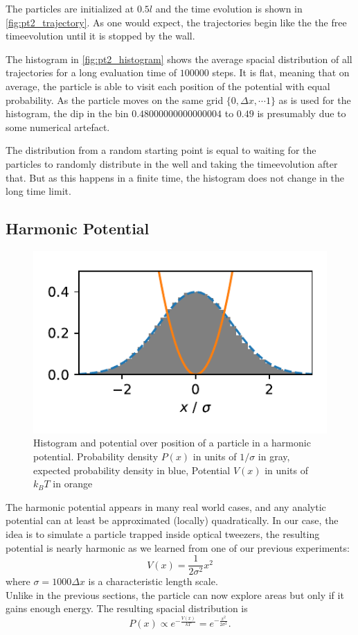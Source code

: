 \documentclass[
    parskip=half, 
    twoside=false,
    twocolumn=true,
    fontsize=11pt,
]{scrarticle}
\begin{document}
The particles are initialized at $0.5 l$ and the time evolution is shown in \autoref{fig:pt2_trajectory}.
As one would expect, the trajectories begin like the the free timeevolution until it is stopped by the wall.

The histogram in \autoref{fig:pt2_histogram} shows the average spacial distribution of all trajectories for a long evaluation time of $100000$ steps. 
It is flat, meaning that on average, the particle is able to visit each position of the potential with equal probability.
As the particle moves on the same grid $\{0, \Delta x, \cdots 1\}$ as is used for the histogram, the dip in the bin $0.48000000000000004$ to $0.49$ is presumably due to some numerical artefact.

The distribution from a random starting point is equal to waiting for the particles to randomly distribute in the well and taking the timeevolution after that.
But as this happens in a finite time, the histogram does not change in the long time limit.


\subsection{Harmonic Potential}
\begin{figure}
    \centering
    \includegraphics{figures/03 histogram.pdf}
    \caption{
        Histogram and potential over position of a particle in a harmonic potential.
        Probability density $P(x)$ in units of $1/\sigma$ in gray, expected probability density in blue, Potential $V(x)$ in units of $k_B T$ in orange
    }
    \label{fig:pt3_histogram}
\end{figure}

The harmonic potential appears in many real world cases, and any analytic potential can at least be approximated (locally) quadratically. In our case, the idea is to simulate a particle trapped inside optical tweezers, the resulting potential is nearly harmonic as we learned from one of our previous experiments:
$$ V(x) = \frac{1}{2 \sigma^2} x^2$$
where $\sigma = 1000 \Delta x$ is a characteristic length scale.\\
Unlike in the previous sections, the particle can now explore areas but only if it gains enough energy. The resulting spacial distribution is
$$
\label{eq:canonical_dist}
 P(x) \propto e^{-\frac{V(x)}{k T}} = e^{-\frac{x^2}{2 \sigma^2}}.
$$
\end{document}
